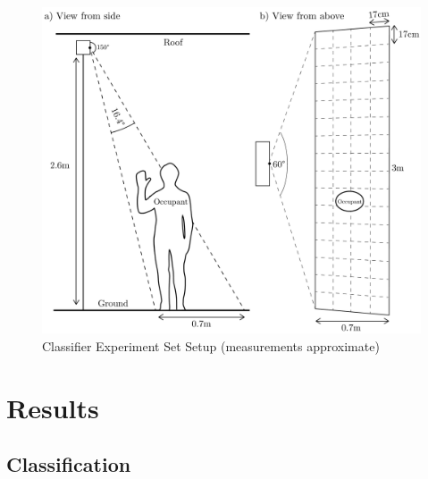 \documentclass[../thesis/thesis.tex]{subfiles}
\begin{document}
 \begin{figure}
 \centering
 \includegraphics[width=\textwidth]{../diagrams/third-exp-setup2.pdf}
 \caption{Classifier Experiment Set Setup (measurements approximate)}
 \label{fig:exps:3setup}
 \end{figure}

 \clearpage{}

\section{Results}
\label{sec:results}

\subsection{Classification}
\label{subsec:classification}
\end{document}
